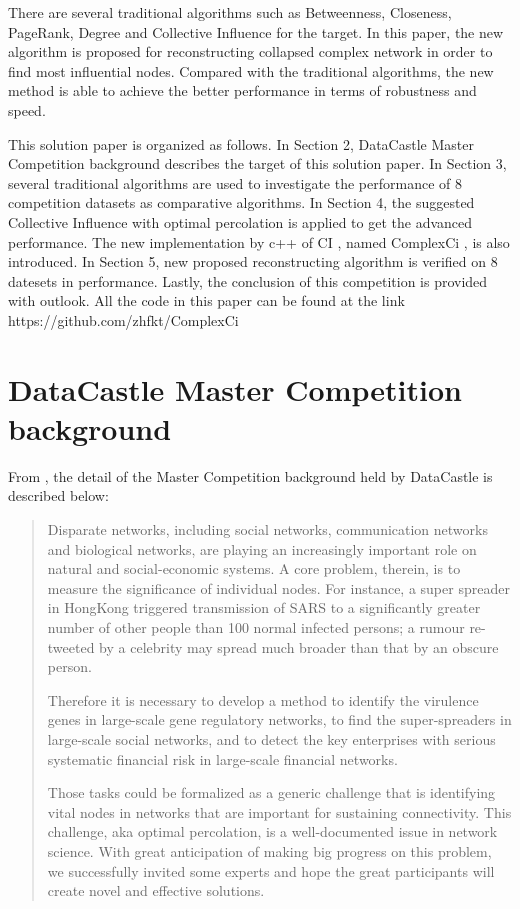 \documentclass{article}
\newenvironment{itquote}
{\begin{quote}\itshape}
	{\end{quote}\ignorespacesafterend}
\begin{document}
	There are several traditional algorithms such as Betweenness\cite{wikiBetweennesscentrality}, Closeness\cite{wikiClosenesscentrality}, PageRank\cite{wikiPageRank}, Degree\cite{wikiCentrality} and Collective Influence\cite{morone2015influence}\cite{morone2016collective} for the target. In this paper, the new algorithm is proposed for reconstructing collapsed complex network in order to find most influential nodes. Compared with the traditional algorithms, the new method is able to achieve the better performance in terms of robustness and speed. 
	
	This solution paper is organized as follows. In Section 2, DataCastle Master Competition background describes the target of this solution paper. In Section 3, several traditional algorithms are used to investigate the performance of 8 competition datasets as comparative algorithms. In Section 4, the suggested Collective Influence with optimal percolation is applied to get the advanced performance. The new implementation by c++ of CI , named ComplexCi , is also introduced. In Section 5, new proposed reconstructing algorithm is verified on 8 datesets in performance. Lastly, the conclusion of this competition is provided with outlook. All the code in this paper can be found at the link https://github.com/zhfkt/ComplexCi \cite{zhfktgithub} \cite{zhfkt2017887989}



	\section{DataCastle Master Competition background}
	
	From \cite{masterCompetitionbackground} , the detail of the Master Competition background held by DataCastle is described below:
	
	\begin{itquote}
		
		Disparate networks, including social networks, communication networks and biological networks, are playing an increasingly important role on natural and social-economic systems. A core problem, therein, is to measure the significance of individual nodes. For instance, a super spreader in HongKong triggered transmission of SARS to a significantly greater number of other people than 100 normal infected persons; a rumour re-tweeted by a celebrity may spread much broader than that by an obscure person.
		
		Therefore it is necessary to develop a method to identify the virulence genes in large-scale gene regulatory networks, to find the super-spreaders in large-scale social networks, and to detect the key enterprises with serious systematic financial risk in large-scale financial networks.
		
		Those tasks could be formalized as a generic challenge that is identifying vital nodes in networks that are important for sustaining connectivity. This challenge, aka optimal percolation, is a well-documented issue in network science. With great anticipation of making big progress on this problem, we successfully invited some experts and hope the great participants will create novel and effective solutions.  		
	\end{itquote}
\end{document}
